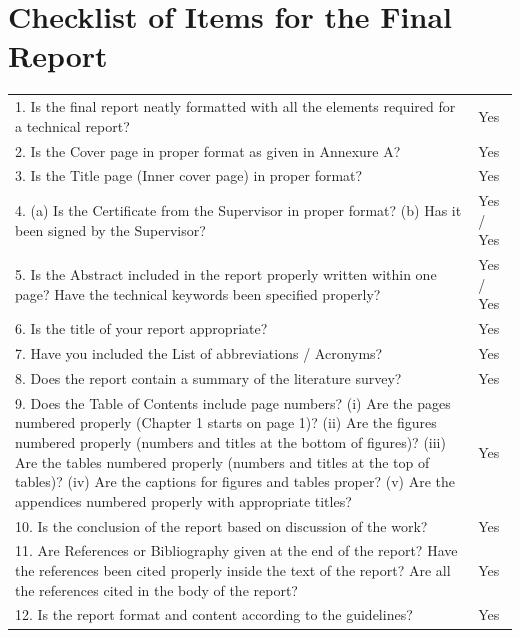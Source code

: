 \chapter*{Checklist of Items for the Final Report}

\begin{longtable}[]{@{}p{}p{}@{}}
\toprule
\endhead
1. Is the final report neatly formatted with all the elements required
for a technical report? & Yes \\
2. Is the Cover page in proper format as given in Annexure A? & Yes \\
3. Is the Title page (Inner cover page) in proper format? & Yes \\
4. (a) Is the Certificate from the Supervisor in proper format?
(b) Has it been signed by the Supervisor? & Yes / Yes \\
5. Is the Abstract included in the report properly written within one
page? Have the technical keywords been specified properly? & Yes /
Yes \\
6. Is the title of your report appropriate? & Yes \\
7. Have you included the List of abbreviations / Acronyms? & Yes \\
8. Does the report contain a summary of the literature survey? & Yes \\
9. Does the Table of Contents include page numbers?
(i) Are the pages numbered properly (Chapter 1 starts on page 1)?
(ii) Are the figures numbered properly (numbers and titles at the
bottom of figures)?
(iii) Are the tables numbered properly (numbers and titles at the top
of tables)?
(iv) Are the captions for figures and tables proper?
(v) Are the appendices numbered properly with appropriate titles? &
Yes \\
10. Is the conclusion of the report based on discussion of the work? &
Yes \\
11. Are References or Bibliography given at the end of the report?
Have the references been cited properly inside the text of the report?
Are all the references cited in the body of the report? & Yes \\
12. Is the report format and content according to the guidelines? & Yes \\
\bottomrule
\end{longtable}

